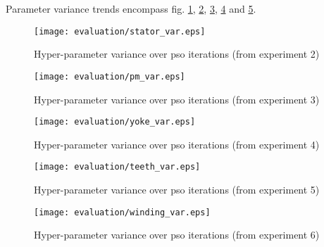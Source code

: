 Parameter variance trends encompass fig. \ref{fig:stator_var}, \ref{fig:pm_var}, \ref{fig:yoke_var}, \ref{fig:teeth_var} and \ref{fig:winding_var}.
\begin{figure}[!hbt]
	\centering
	\texttt{[image: evaluation/stator\_var.eps]}
	\caption{Hyper-parameter variance over \gls{pso} iterations (from experiment 2)}
	\label{fig:stator_var}
\end{figure}
\begin{figure}[!hbt]
	\centering
	\texttt{[image: evaluation/pm\_var.eps]}
	\caption{Hyper-parameter variance over \gls{pso} iterations (from experiment 3)}
	\label{fig:pm_var}
\end{figure}
\begin{figure}[!hbt]
	\centering
	\texttt{[image: evaluation/yoke\_var.eps]}
	\caption{Hyper-parameter variance over \gls{pso} iterations (from experiment 4)}
	\label{fig:yoke_var}
\end{figure}
\begin{figure}[!hbt]
	\centering
	\texttt{[image: evaluation/teeth\_var.eps]}
	\caption{Hyper-parameter variance over \gls{pso} iterations (from experiment 5)}
	\label{fig:teeth_var}
\end{figure}
\begin{figure}[!hbt]
	\centering
	\texttt{[image: evaluation/winding\_var.eps]}
	\caption{Hyper-parameter variance over \gls{pso} iterations (from experiment 6)}
	\label{fig:winding_var}
\end{figure}\clearpage

